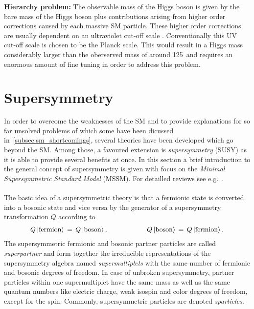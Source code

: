 \begin{description}
\item \textbf{Hierarchy problem:} The observable mass of the Higgs boson is given by the bare mass of the Higgs boson plus contributions arising from higher order corrections caused by each massive SM particle. These higher order corrections are usually dependent on an ultraviolet cut-off scale . Conventionally this UV cut-off scale is chosen to be the Planck scale. This would result in a Higgs mass considerably larger than the oberserved mass of around 125~\gev and requires an enormous amount of fine tuning in order to address this problem. 
\end{description}

\section{Supersymmetry}
\label{sec:susy}
In order to overcome the weaknesses of the SM and to provide explanations for so far unsolved problems of which some have been dicussed in~\ref{subsec:sm_shortcomings}, several theories have been developed which go beyond the SM. Among those, a favoured extension is \textit{supersymmetry} (SUSY) as it is able to provide several benefits at once. In this section a brief introduction to the general concept of supersymmetry is given with focus on the \textit{Minimal Supersymmetric Standard Model} (MSSM). For detailled reviews see e.g.~\cite{Aitchison:2005cf, Martin:1997ns}.\\ 
\\
The basic idea of a supersymmetric theory is that a fermionic state is converted into a bosonic state and vice versa by the generator of a supersymmetry transformation $Q$ according to
\begin{equation*}
Q \ket{\mathrm{fermion}} \, = \, Q \ket{\mathrm{boson}}, \hspace{20mm} Q \ket{\mathrm{boson}} \, = \, Q \ket{\mathrm{fermion}}.
\end{equation*}
The supersymmetric fermionic and bosonic partner particles are called \textit{superpartner} and form together the irreducible representations of the supersymmetry algebra named \textit{supermultiplets} with the same number of fermionic and bosonic degrees of freedom. In case of unbroken supersymmetry, partner particles within one supermultiplet have the same mass as well as the same quantum numbers like electric charge, weak isospin and color degrees of freedom, except for the spin. Commonly, supersymmetric particles are denoted \textit{sparticles}. \\
